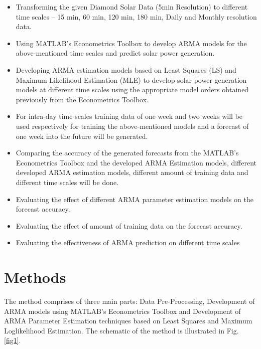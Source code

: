\documentclass[journal]{IEEEtran}
\begin{document}
\begin{itemize}
  \item Transforming the given Diamond Solar Data (5min Resolution) to different time scales – 15 min, 60 min, 120 min, 180 min, Daily and Monthly resolution data.
  \item Using MATLAB’s Econometrics Toolbox to develop ARMA models for the above-mentioned time scales and predict solar power generation.

  \item Developing ARMA estimation models based on Least Squares (LS) and Maximum Likelihood Estimation (MLE) to develop solar power generation models at different time scales using the appropriate model orders obtained previously from the Econometrics Toolbox.
  \item For intra-day time scales training data of one week and two weeks will be used respectively for training the above-mentioned models and a forecast of one week into the future will be generated. 
  \item Comparing the accuracy of the generated forecasts from the MATLAB’s Econometrics Toolbox and the developed ARMA Estimation models, different developed ARMA estimation models, different amount of training data and different time scales will be done.
  \item Evaluating the effect of different ARMA parameter estimation models on the forecast accuracy.
  \item Evaluating the effect of amount of training data on the forecast accuracy.
  \item Evaluating the effectiveness of ARMA prediction on different time scales
  
   
\end{itemize}




\section{Methods}

The method comprises of three main parts:  Data Pre-Processing, Development of ARMA models using MATLAB's Econometrics Toolbox and Development of ARMA Parameter Estimation techniques based on Least Squares and Maximum Loglikelihood Estimation. The schematic of the method is illustrated in Fig. \ref{fig1}.
\end{document}

